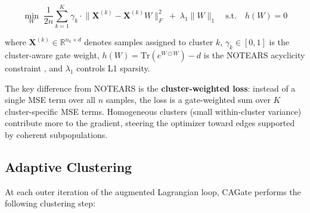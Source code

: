 \documentclass[12pt,a4paper]{article}
\begin{document}
\begin{equation}\label{eq:cagate_obj}




\min_{W} \; \frac{1}{2n} \sum_{k=1}^{K} \gamma_k \cdot \big\| \mathbf{X}^{(k)} - \mathbf{X}^{(k)} W \big\|_F^2 \;+\; \lambda_1 \|W\|_1 \quad \text{s.t.} \quad h(W) = 0




\end{equation}









where $\mathbf{X}^{(k)} \in \mathbb{R}^{n_k \times d}$ denotes samples assigned to cluster $k$, $\gamma_k \in [0,1]$ is the cluster-aware gate weight, $h(W) = \text{Tr}(e^{W \odot W}) - d$ is the NOTEARS acyclicity constraint \cite{Zheng2018}, and $\lambda_1$ controls L1 sparsity.









The key difference from NOTEARS is the \textbf{cluster-weighted loss}: instead of a single MSE term over all $n$ samples, the loss is a gate-weighted sum over $K$ cluster-specific MSE terms. Homogeneous clusters (small within-cluster variance) contribute more to the gradient, steering the optimizer toward edges supported by coherent subpopulations.









\subsection{Adaptive Clustering}









At each outer iteration of the augmented Lagrangian loop, CAGate performs the following clustering step:
\end{document}

